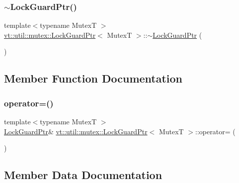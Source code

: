\subsubsection{\texorpdfstring{$\sim$\+Lock\+Guard\+Ptr()}{~LockGuardPtr()}}
{\footnotesize\ttfamily template$<$typename MutexT $>$ \\
\hyperlink{structvt_1_1util_1_1mutex_1_1_lock_guard_ptr}{vt\+::util\+::mutex\+::\+Lock\+Guard\+Ptr}$<$ MutexT $>$\+::$\sim$\hyperlink{structvt_1_1util_1_1mutex_1_1_lock_guard_ptr}{Lock\+Guard\+Ptr} (\begin{DoxyParamCaption}{ }\end{DoxyParamCaption})\hspace{0.3cm}{\ttfamily [inline]}}



\subsection{Member Function Documentation}
\mbox{\label{structvt_1_1util_1_1mutex_1_1_lock_guard_ptr_a17f01073ff7844fc0215758035ff74fb}} 
\subsubsection{\texorpdfstring{operator=()}{operator=()}}
{\footnotesize\ttfamily template$<$typename MutexT $>$ \\
\hyperlink{structvt_1_1util_1_1mutex_1_1_lock_guard_ptr}{Lock\+Guard\+Ptr}\& \hyperlink{structvt_1_1util_1_1mutex_1_1_lock_guard_ptr}{vt\+::util\+::mutex\+::\+Lock\+Guard\+Ptr}$<$ MutexT $>$\+::operator= (\begin{DoxyParamCaption}\item[{\hyperlink{structvt_1_1util_1_1mutex_1_1_lock_guard_ptr}{Lock\+Guard\+Ptr}$<$ MutexT $>$ const \&}]{ }\end{DoxyParamCaption})\hspace{0.3cm}{\ttfamily [delete]}}



\subsection{Member Data Documentation}
\mbox{\label{structvt_1_1util_1_1mutex_1_1_lock_guard_ptr_a305be2f257219435a9f50af1c1ebbac9}} 
